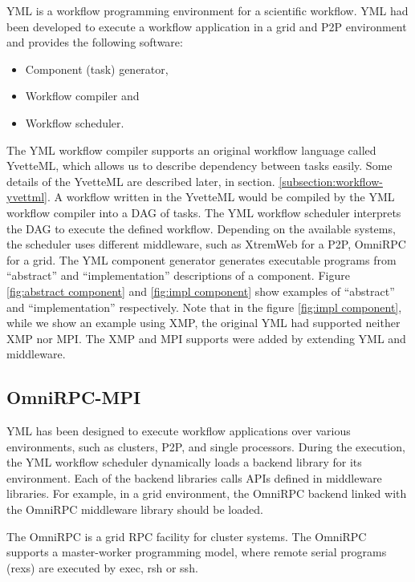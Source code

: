 \documentclass[graybox]{svmult}
\begin{document}
YML\cite{delannoy2004a, delannoy2006a, delannoy2006b} is a workflow programming environment for a scientific workflow. YML had been developed to execute a workflow application in a grid and P2P environment and provides the following software:
\begin{itemize}
 \item Component (task) generator,  
 \item Workflow compiler and 
 \item Workflow scheduler.
\end{itemize}
The YML workflow compiler supports an original workflow language called YvetteML, which allows us to describe dependency between tasks easily. 
Some details of the YvetteML are described later, in section. \ref{subsection:workflow-yvettml}.
A workflow written in the YvetteML would be compiled by the YML workflow compiler into a DAG of tasks. The YML workflow scheduler interprets the DAG to execute the defined workflow. Depending on the available systems, the scheduler uses different middleware, such as XtremWeb for a P2P, OmniRPC\cite{sato2001a} for a grid. 
The YML component generator generates executable programs from ``abstract'' and ``implementation'' descriptions of a component. 
Figure \ref{fig:abstract component} and \ref{fig:impl component} show examples of ``abstract'' and ``implementation'' respectively. Note that in the figure \ref{fig:impl component}, while we show an example using XMP, the original YML had supported neither XMP nor MPI. 
The XMP and MPI supports were added by extending YML and middleware. 

\subsection{OmniRPC-MPI}
\label{subsection:omnirpc-mpi}

YML has been designed to execute workflow applications over various environments, such as clusters, P2P, and single processors.
During the execution, the YML workflow scheduler dynamically loads a backend library for its environment. 
Each of the backend libraries calls APIs defined in middleware libraries. 
For example, in a grid environment, the OmniRPC backend linked with the OmniRPC middleware library should be loaded. 

The OmniRPC \cite{sato2001a} is a grid RPC facility for cluster systems. The OmniRPC supports a master-worker programming model, where remote serial programs (rexs) are executed by exec, rsh or ssh. 
\end{document}
